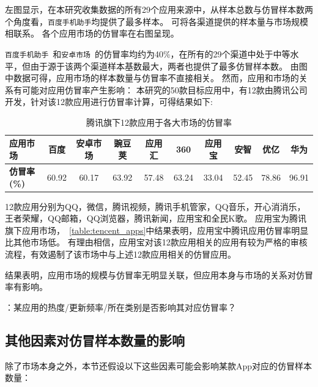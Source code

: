 左图显示，在本研究收集数据的所有29个应用来源中，从样本总数与仿冒样本数两个角度看，\texttt{百度手机助手}均提供了最多样本。
可将各渠道提供的样本量与市场规模相联系。
各个应用市场的仿冒率在右图呈现。


\texttt{百度手机助手}~\cite{Baiduappstore}和\texttt{安卓市场}~\cite{Hiapk}的仿冒率均约为40\%，在所有的29个渠道中处于中等水平，但由于源于该两个渠道样本基数最大，两者也提供了最多仿冒样本数。
由图中数据可得，应用市场的样本数量与仿冒率不直接相关。
然而，应用和市场的关系有可能对应用仿冒率产生影响：
本研究的50款目标应用中，有12款由腾讯公司开发，针对该12款应用进行仿冒率计算，可得结果如下:

\begin{table}[htbp]
    \renewcommand{\arraystretch}{1}
    \footnotesize
    \centering
    \caption{腾讯旗下12款应用于各大市场的仿冒率}
    \vspace{1mm}
    \begin{tabular}{l c c c c c c c c c}
        \toprule
        {\bf 应用市场}   & {\bf 百度} & {\bf 安卓市场} & {\bf 豌豆荚} & {\bf 应用汇} & {\bf 360} & {\bf 应用宝} & {\bf 安智} & {\bf 优亿} & {\bf 华为} \\
        \midrule
        {\bf 仿冒率(\%)} & 60.92      & 60.17          & 63.92        & 57.48        & 63.24     & 33.04        & 52.45      & 78.86      & 96.91      \\
        \bottomrule
    \end{tabular}
    \label{table:tencent_apps}
\end{table}

12款应用分别为QQ，微信，腾讯视频，腾讯手机管家，QQ音乐，开心消消乐，王者荣耀，QQ邮箱，QQ浏览器，腾讯新闻，应用宝和全民K歌。
应用宝为腾讯旗下应用市场，~\autoref{table:tencent_apps}中结果表明，应用宝中腾讯应用仿冒率明显比其他市场低。
有理由相信，应用宝对该12款应用相关的应用有较为严格的审核流程，有效遏制了该市场中与上述12款应用相关的仿冒应用。

结果表明，应用市场的规模与仿冒率无明显关联，但应用本身与市场的关系对仿冒率有影响。

：某应用的热度/更新频率/所在类别是否影响其对应仿冒率？

\subsection{其他因素对仿冒样本数量的影响}
除了市场本身之外，本节还假设以下这些因素可能会影响某款App对应的仿冒样本数量：

